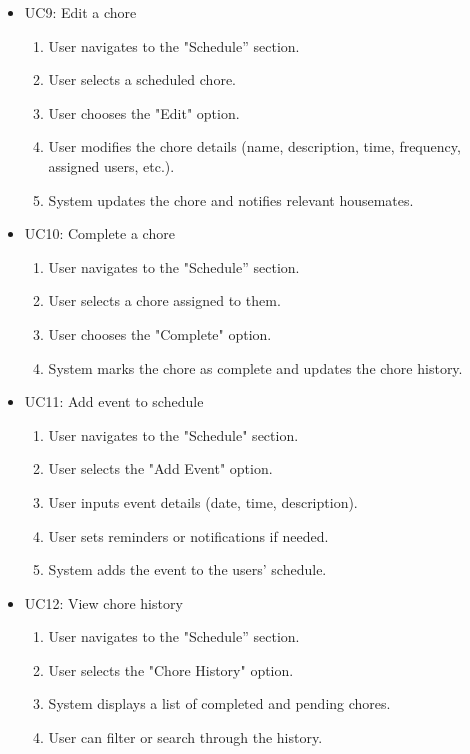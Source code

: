 \documentclass{scrreprt}
\theoremstyle{definition}
\begin{document}
\begin{itemize}
    \item UC9: Edit a chore
    \begin{enumerate}
        \item User navigates to the "Schedule” section.
        \item User selects a scheduled chore.
        \item User chooses the "Edit" option.
        \item User modifies the chore details (name, description, time, frequency, assigned users, etc.).
        \item System updates the chore and notifies relevant housemates.
    \end{enumerate}
    
    \item UC10: Complete a chore
    \begin{enumerate}
        \item User navigates to the "Schedule” section.
        \item User selects a chore assigned to them.
        \item User chooses the "Complete" option.
        \item System marks the chore as complete and updates the chore history.
    \end{enumerate}
    
    \item UC11: Add event to schedule
    \begin{enumerate}
        \item User navigates to the "Schedule" section.
        \item User selects the "Add Event" option.
        \item User inputs event details (date, time, description).
        \item User sets reminders or notifications if needed.
        \item System adds the event to the users' schedule.
    \end{enumerate}
    
    \item UC12: View chore history
    \begin{enumerate}
        \item User navigates to the "Schedule” section.
        \item User selects the "Chore History" option.
        \item System displays a list of completed and pending chores.
        \item User can filter or search through the history.
    \end{enumerate}
    

\end{itemize}
\end{document}
